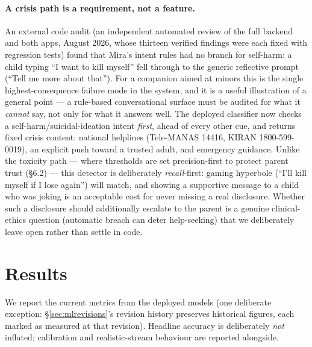 \documentclass[11pt,a4paper]{article}
\begin{document}
\paragraph{A crisis path is a requirement, not a feature.} An external code audit
(an independent automated review of the full backend and both apps, August 2026,
whose thirteen verified findings were each fixed with regression tests) found that
Mira's intent rules had no branch for self-harm: a child
typing ``I want to kill myself'' fell through to the generic reflective prompt (``Tell
me more about that''). For a companion aimed at minors this is the single
highest-consequence failure mode in the system, and it is a useful illustration of a
general point --- a rule-based conversational surface must be audited for what it
\emph{cannot} say, not only for what it answers well. The deployed classifier now
checks a self-harm/suicidal-ideation intent \emph{first}, ahead of every other cue, and
returns fixed crisis content: national helplines (Tele-MANAS 14416, KIRAN
1800-599-0019), an explicit push toward a trusted adult, and emergency guidance. Unlike
the toxicity path --- where thresholds are set precision-first to protect parent trust
(\S6.2) --- this detector is deliberately \emph{recall}-first: gaming hyperbole (``I'll
kill myself if I lose again'') will match, and showing a supportive message to a child
who was joking is an acceptable cost for never missing a real disclosure. Whether such
a disclosure should additionally escalate to the parent is a genuine clinical-ethics
question (automatic breach can deter help-seeking) that we deliberately leave open
rather than settle in code.

\section{Results}
We report the current metrics from the deployed models (one deliberate
exception: \S\ref{sec:mlrevisions}'s revision history preserves historical figures,
each marked as measured at that revision). Headline accuracy is
deliberately \emph{not} inflated; calibration and realistic-stream behaviour are
reported alongside.
\end{document}
